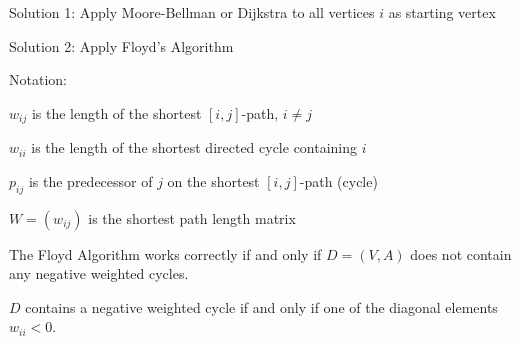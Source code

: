 \begin{lec}[2011-10-24]\end{lec}


Solution 1: Apply Moore-Bellman or Dijkstra to all vertices $i$ as starting vertex

Solution 2: Apply Floyd's Algorithm

Notation: 

$w_{ij}$ is the length of the shortest $[i,j]$-path, $i \neq j$

$w_{ii}$ is the length of the shortest directed cycle containing $i$

$p_{ij}$ is the predecessor of $j$ on the shortest $[i,j]$-path (cycle)

$W =(w_{ij}) $ is the shortest path length matrix


\begin{thm} %
The Floyd Algorithm works correctly if and only if $D = (V,A)$ does not contain any negative weighted cycles.

$D$ contains a negative weighted cycle if and only if one of the diagonal elements $w_{ii}<0$.
\end{thm}

